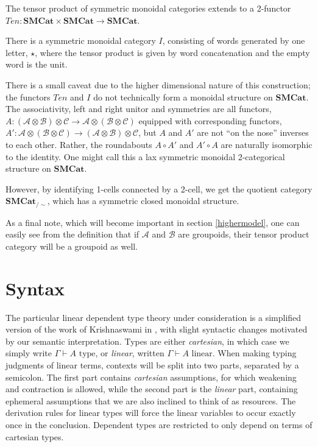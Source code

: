 The tensor product of symmetric monoidal categories extends to a 2-functor $Ten : \mathbf{SMCat} \times \mathbf{SMCat} \to \mathbf{SMCat}$.
\begin{defn}
  There is a symmetric monoidal category $I$, consisting of words generated by one letter, $\star$, where the tensor product is given by word concatenation and the empty word is the unit.
\end{defn}
There is a small caveat due to the higher dimensional nature of this construction; the functors $Ten$ and $I$ do not technically form a monoidal structure on $\mathbf{SMCat}$. The associativity, left and right unitor and symmetries are all functors, $A : (\mathcal{A} \otimes \mathcal{B}) \otimes \mathcal{C} \to \mathcal{A} \otimes (\mathcal{B} \otimes \mathcal{C})$ equipped with corresponding functors, $A' : \mathcal{A} \otimes (\mathcal{B} \otimes \mathcal{C}) \to (\mathcal{A} \otimes \mathcal{B}) \otimes \mathcal{C}$, but $A$ and $A'$ are not ``on the nose'' inverses to each other. Rather, the roundabouts $A \circ A'$ and $A' \circ A$ are naturally isomorphic to the identity. One might call this a lax symmetric monoidal 2-categorical structure on $\mathbf{SMCat}$.

However, by identifying 1-cells connected by a 2-cell, we get the quotient category $\mathbf{SMCat}_{/\sim}$, which has a symmetric closed monoidal structure.

As a final note, which will become important in section \ref{highermodel}, one can easily see from the definition that if $\mathcal{A}$ and $\mathcal{B}$ are groupoids, their tensor product category will be a groupoid as well.
\section{Syntax}\label{syntax}
The particular linear dependent type theory under consideration is a simplified version of the work of Krishnaswami in \cite{krishnaswami}, with slight syntactic changes motivated by our semantic interpretation. Types are either \textit{cartesian}, in which case we simply write $\Gamma \vdash A \text{ type}$, or \textit{linear}, written $\Gamma \vdash A \text{ linear}$. When making typing judgments of linear terms, contexts will be split into two parts, separated by a semicolon. The first part contains \textit{cartesian} assumptions, for which weakening and contraction is allowed, while the second part is the \textit{linear} part, containing ephemeral assumptions that we are also inclined to think of as resources. The derivation rules for linear types will force the linear variables to occur exactly once in the conclusion. Dependent types are restricted to only depend on terms of cartesian types. 
